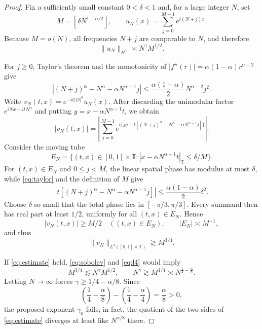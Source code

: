 \documentclass[11pt]{article}
\newcommand{\T}{\mathbb T}
\begin{document}
\begin{proof}
Fix a sufficiently small constant $0<\delta<1$ and, for a large integer $N$,
set
\[
 M=\left\lfloor\delta N^{1-\alpha/2}\right\rfloor,
 \qquad
 u_N(x)=\sum_{j=0}^{M-1}e^{i(N+j)x}.
\]
Because $M=o(N)$, all frequencies $N+j$ are comparable to $N$, and therefore
\begin{equation}\label{eq:sobolev}
 \|u_N\|_{H^\gamma}\asymp N^\gamma M^{1/2}.
\end{equation}

For $j\ge0$, Taylor's theorem and the monotonicity of
$|f''(r)|=\alpha(1-\alpha)r^{\alpha-2}$ give
\begin{equation}\label{eq:taylor}
 \left|(N+j)^\alpha-N^\alpha-\alpha N^{\alpha-1}j\right|
 \le \frac{\alpha(1-\alpha)}2N^{\alpha-2}j^2.
\end{equation}
Write $v_N(t,x)=e^{-it|D|^\alpha}u_N(x)$. After discarding the unimodular
factor $e^{iNx-itN^\alpha}$ and putting
$y=x-\alpha N^{\alpha-1}t$, we obtain
\[
 |v_N(t,x)|=\left|\sum_{j=0}^{M-1}
 e^{i\{jy-t[(N+j)^\alpha-N^\alpha-\alpha N^{\alpha-1}j]\}}\right|.
\]
Consider the moving tube
\[
 E_N=\{(t,x)\in[0,1]\times\T:
       |x-\alpha N^{\alpha-1}t|_{\T}\le\delta/M\}.
\]
For $(t,x)\in E_N$ and $0\le j<M$, the linear spatial phase has modulus at
most $\delta$, while \eqref{eq:taylor} and the definition of $M$ give
\[
 \left|t[(N+j)^\alpha-N^\alpha-\alpha N^{\alpha-1}j]\right|
 \le \frac{\alpha(1-\alpha)}2\delta^2.
\]
Choose $\delta$ so small that the total phase lies in
$[-\pi/3,\pi/3]$. Every summand then has real part at least $1/2$, uniformly
for all $(t,x)\in E_N$. Hence
\begin{equation}\label{eq:lower}
 |v_N(t,x)|\ge M/2\quad ((t,x)\in E_N),
 \qquad |E_N|\asymp M^{-1},
\end{equation}
and thus
\begin{equation}\label{eq:l4}
 \|v_N\|_{L^4([0,1]\times\T)}\gtrsim M^{3/4}.
\end{equation}

If \eqref{eq:estimate} held, \eqref{eq:sobolev} and \eqref{eq:l4} would imply
\[
 M^{3/4}\lesssim N^\gamma M^{1/2},
 \qquad N^\gamma\gtrsim M^{1/4}\asymp
 N^{\frac14-\frac{\alpha}{8}}.
\]
Letting $N\to\infty$ forces
$\gamma\ge1/4-\alpha/8$. Since
\[
 \left(\frac14-\frac{\alpha}{8}\right)
 -\left(\frac14-\frac{\alpha}{4}\right)=\frac{\alpha}{8}>0,
\]
the proposed exponent $\gamma_0$ fails; in fact, the quotient of the two
sides of \eqref{eq:estimate} diverges at least like $N^{\alpha/8}$ there.
\end{proof}
\end{document}
